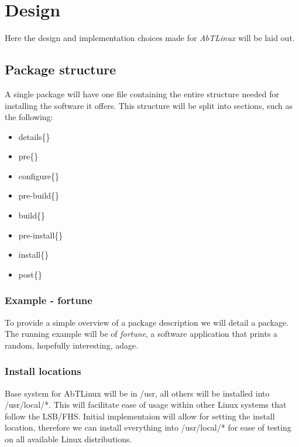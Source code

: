 \newpage
\section{Design}  
Here the design and implementation choices made for \emph{AbTLinux} will be laid out.

\subsection{Package structure}
A single package will have one file containing the entire structure needed for installing the software it offers. This structure will be split into sections, such as the following:
\begin{itemize}
  \item details\{\}
  \item pre\{\}
  \item configure\{\}
  \item pre-build\{\}
  \item build\{\}
  \item pre-install\{\}
  \item install\{\}
  \item post\{\}
\end{itemize}


\subsubsection{Example - fortune}
To provide a simple overview of a package description we will detail a package. The running example will be of \emph{fortune}, a software application that prints a random, hopefully interesting, adage.



\subsubsection{Install locations}
Base system for AbTLinux will be in /usr, all others will be installed into /usr/local/*. This will facilitate ease of usage within other Linux systems that follow the LSB/FHS. Initial implementaion will allow for setting the install location, therefore we can install everything into /usr/local/* for ease of testing on all available Linux distributions.

